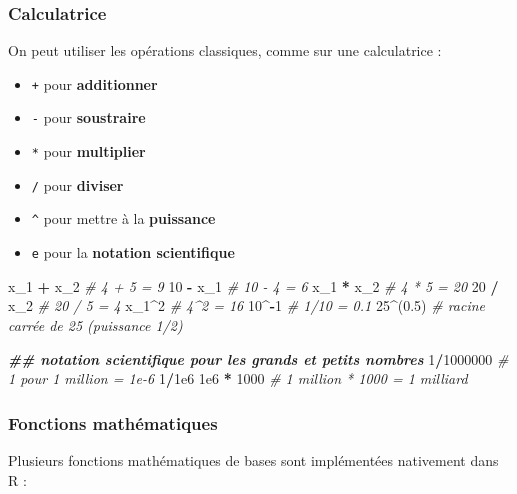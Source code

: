 \documentclass[
]{book}
\newenvironment{Shaded}{\begin{snugshade}}{\end{snugshade}}
\newcommand{\CommentTok}[1]{\textcolor[rgb]{0.56,0.35,0.01}{\textit{#1}}}
\newcommand{\DecValTok}[1]{\textcolor[rgb]{0.00,0.00,0.81}{#1}}
\newcommand{\DocumentationTok}[1]{\textcolor[rgb]{0.56,0.35,0.01}{\textbf{\textit{#1}}}}
\newcommand{\FloatTok}[1]{\textcolor[rgb]{0.00,0.00,0.81}{#1}}
\newcommand{\NormalTok}[1]{#1}
\newcommand{\SpecialCharTok}[1]{\textcolor[rgb]{0.81,0.36,0.00}{\textbf{#1}}}
\providecommand{\tightlist}{%
  \setlength{\itemsep}{0pt}\setlength{\parskip}{0pt}}
\begin{document}
\subsubsection{Calculatrice}\label{calculatrice}

On peut utiliser les opérations classiques, comme sur une calculatrice :

\begin{itemize}
\tightlist
\item
  \texttt{+} pour \textbf{additionner}
\item
  \texttt{-} pour \textbf{soustraire}
\item
  \texttt{*} pour \textbf{multiplier}
\item
  \texttt{/} pour \textbf{diviser}
\item
  \texttt{\^{}} pour mettre à la \textbf{puissance}
\item
  \texttt{e} pour la \textbf{notation scientifique}
\end{itemize}

\begin{Shaded}
\begin{Highlighting}[]
\NormalTok{x\_1 }\SpecialCharTok{+}\NormalTok{ x\_2 }\CommentTok{\# 4 + 5 = 9}
\DecValTok{10} \SpecialCharTok{{-}}\NormalTok{ x\_1 }\CommentTok{\# 10 {-} 4 = 6}
\NormalTok{x\_1 }\SpecialCharTok{*}\NormalTok{ x\_2 }\CommentTok{\#  4 * 5 = 20}
\DecValTok{20} \SpecialCharTok{/}\NormalTok{ x\_2 }\CommentTok{\# 20 / 5 = 4}
\NormalTok{x\_1}\SpecialCharTok{\^{}}\DecValTok{2} \CommentTok{\#  4\^{}2 = 16}
\DecValTok{10}\SpecialCharTok{\^{}{-}}\DecValTok{1} \CommentTok{\# 1/10 = 0.1}
\DecValTok{25}\SpecialCharTok{\^{}}\NormalTok{(}\FloatTok{0.5}\NormalTok{) }\CommentTok{\# racine carrée de 25 (puissance 1/2)}

\DocumentationTok{\#\# notation scientifique pour les grands et petits nombres}
\DecValTok{1}\SpecialCharTok{/}\DecValTok{1000000} \CommentTok{\# 1 pour 1 million = 1e{-}6}
\DecValTok{1}\SpecialCharTok{/}\FloatTok{1e6}
\FloatTok{1e6} \SpecialCharTok{*} \DecValTok{1000} \CommentTok{\# 1 million * 1000 = 1 milliard}
\end{Highlighting}
\end{Shaded}

\subsubsection{Fonctions mathématiques}\label{fonctions-mathuxe9matiques}

Plusieurs fonctions mathématiques de bases sont implémentées nativement dans R :
\end{document}
